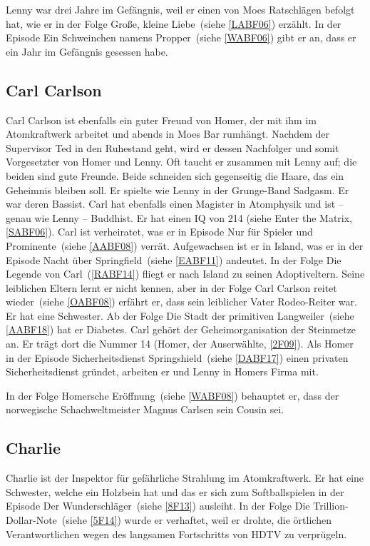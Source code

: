 Lenny war drei Jahre im Gefängnis, weil er einen von Moes Ratschlägen befolgt hat, wie er in der Folge \glqq Große, kleine Liebe\grqq\ (siehe \ref{LABF06}) erzählt. In der Episode \glqq Ein Schweinchen namens Propper\grqq\ (siehe \ref{WABF06}) gibt er an, dass er ein Jahr im Gefängnis gesessen habe.


\subsection{Carl Carlson}\label{CarlCarlson}
Carl Carlson ist ebenfalls ein guter Freund von Homer, der mit ihm im Atomkraftwerk arbeitet und abends in Moes Bar rumhängt. Nachdem der Supervisor Ted in den Ruhestand geht, wird er dessen Nachfolger und somit Vorgesetzter von Homer und Lenny. Oft taucht er zusammen mit Lenny auf; die beiden sind gute Freunde. Beide schneiden sich gegenseitig die Haare, das ein Geheimnis bleiben soll. Er spielte wie Lenny in der Grunge-Band \glqq Sadgasm\grqq . Er war deren Bassist. Carl hat ebenfalls einen Magister in Atomphysik und ist -- genau wie Lenny -- Buddhist. Er hat einen IQ von 214 (siehe \glqq Enter the Matrix\grqq , \ref{SABF06}). Carl ist verheiratet, was er in Episode \glqq Nur für Spieler und Prominente\grqq\ (siehe \ref{AABF08}) verrät. Aufgewachsen ist er in Island, was er in der Episode \glqq Nacht über Springfield\grqq\ (siehe \ref{EABF11}) andeutet. In der Folge \glqq Die Legende von Carl\grqq\ (\ref{RABF14}) fliegt er nach Island zu seinen Adoptiveltern. Seine leiblichen Eltern lernt er nicht kennen, aber in der Folge \glqq Carl Carlson reitet wieder\grqq\ (siehe \ref{OABF08}) erfährt er, dass sein leiblicher Vater Rodeo-Reiter war. Er hat eine Schwester. Ab der Folge \glqq Die Stadt der primitiven Langweiler\grqq\ (siehe \ref{AABF18}) hat er Diabetes. Carl gehört der Geheimorganisation der Steinmetze an. Er trägt dort die Nummer 14 (\glqq Homer, der Auserwählte\grqq, \ref{2F09}). Als Homer in der Episode \glqq Sicherheitsdienst Springshield\grqq\ (siehe \ref{DABF17}) einen privaten Sicherheitsdienst gründet, arbeiten er und Lenny in Homers Firma mit.

In der Folge \glqq Homersche Eröffnung\grqq\ (siehe \ref{WABF08}) behauptet er, dass der norwegische Schachweltmeister Magnus Carlsen sein Cousin sei.

\subsection{Charlie}
Charlie ist der Inspektor für gefährliche Strahlung im Atomkraftwerk. Er hat eine Schwester, welche ein Holzbein hat und das er sich zum Softballspielen in der Episode \glqq Der Wunderschläger\grqq\ (siehe \ref{8F13}) ausleiht.
In der Folge \glqq Die Trillion-Dollar-Note\grqq\ (siehe \ref{5F14}) wurde er verhaftet, weil er drohte, die örtlichen Verantwortlichen wegen des langsamen Fortschritts von HDTV zu verprügeln.

